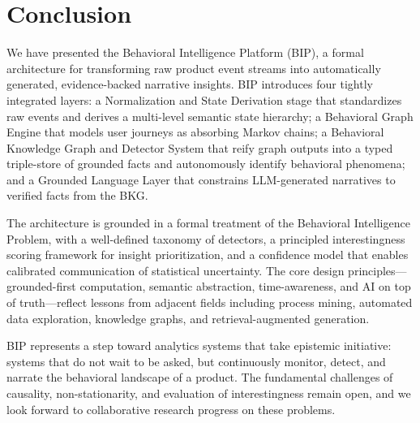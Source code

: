 \documentclass[12pt, a4paper]{article}
\begin{document}
\section{Conclusion}
\label{sec:conclusion}

We have presented the Behavioral Intelligence Platform (BIP), a formal architecture for transforming raw product event streams into automatically generated, evidence-backed narrative insights. BIP introduces four tightly integrated layers: a Normalization and State Derivation stage that standardizes raw events and derives a multi-level semantic state hierarchy; a Behavioral Graph Engine that models user journeys as absorbing Markov chains; a Behavioral Knowledge Graph and Detector System that reify graph outputs into a typed triple-store of grounded facts and autonomously identify behavioral phenomena; and a Grounded Language Layer that constrains LLM-generated narratives to verified facts from the BKG.

The architecture is grounded in a formal treatment of the Behavioral Intelligence Problem, with a well-defined taxonomy of detectors, a principled interestingness scoring framework for insight prioritization, and a confidence model that enables calibrated communication of statistical uncertainty. The core design principles---grounded-first computation, semantic abstraction, time-awareness, and AI on top of truth---reflect lessons from adjacent fields including process mining, automated data exploration, knowledge graphs, and retrieval-augmented generation.

BIP represents a step toward analytics systems that take epistemic initiative: systems that do not wait to be asked, but continuously monitor, detect, and narrate the behavioral landscape of a product. The fundamental challenges of causality, non-stationarity, and evaluation of interestingness remain open, and we look forward to collaborative research progress on these problems.
\end{document}
